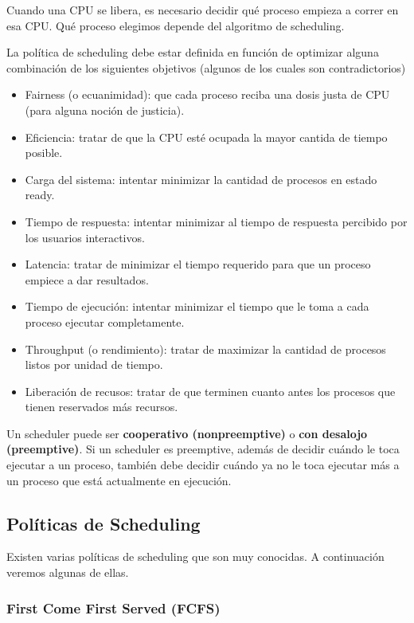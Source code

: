 \documentclass{article}
\begin{document}
Cuando una CPU se libera, es necesario decidir qu\'e proceso empieza a correr en esa CPU. Qu\'e proceso elegimos depende del algoritmo de scheduling.

La pol\'itica de scheduling debe estar definida en funci\'on de optimizar alguna combinaci\'on de los siguientes objetivos (algunos de los cuales son contradictorios)

\begin{itemize}
\item Fairness (o ecuanimidad): que cada proceso reciba una dosis justa de CPU (para alguna noci\'on de justicia).
\item Eficiencia: tratar de que la CPU est\'e ocupada la mayor cantida de tiempo posible.
\item Carga del sistema: intentar minimizar la cantidad de procesos en estado ready.
\item Tiempo de respuesta: intentar minimizar al tiempo de respuesta percibido por los usuarios interactivos.
\item Latencia: tratar de minimizar el tiempo requerido para que un proceso empiece a dar resultados.
\item Tiempo de ejecuci\'on: intentar minimizar el tiempo que le toma a cada proceso ejecutar completamente.
\item Throughput (o rendimiento): tratar de maximizar la cantidad de procesos listos por unidad de tiempo.
\item Liberaci\'on de recusos: tratar de que terminen cuanto antes los procesos que tienen reservados m\'as recursos.
\end{itemize}

Un scheduler puede ser \textbf{cooperativo (nonpreemptive)} o \textbf{con desalojo (preemptive)}. Si un scheduler es preemptive, adem\'as de decidir cu\'ando le toca ejecutar a un proceso, tambi\'en debe decidir cu\'ando ya no le toca ejecutar m\'as a un proceso que est\'a actualmente en ejecuci\'on.

\subsection{Pol\'iticas de Scheduling}

Existen varias pol\'iticas de scheduling que son muy conocidas. A continuaci\'on veremos algunas de ellas.

\subsubsection{First Come First Served (FCFS)}
\end{document}
